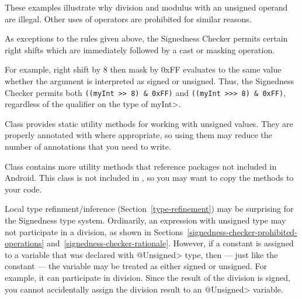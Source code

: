 These examples illustrate why division and modulus with an unsigned operand
are illegal.  Other uses of operators are prohibited for similar reasons.



As exceptions to the rules given above, the Signedness Checker permits
certain right shifts which are immediately followed by a cast or
masking operation.

For example, right shift by 8 then mask by 0xFF evaluates to the same value
whether the argument is interpreted as signed or unsigned.  Thus, the
Signedness Checker permits both \verb|((myInt >> 8) & 0xFF)| and
\verb|((myInt >>> 8) & 0xFF)|, regardless of the qualifier on the type of
\<myInt>.




Class  provides static
utility methods for working with unsigned values.  They are
properly annotated with 
where appropriate, so using them may reduce the number of annotations that
you need to write.

Class  contains more utility
methods that reference packages not included in Android.  This class is not
included in , so you may want to copy the methods to your code.



Local type refinment/inference (Section~\ref{type-refinement}) may be
surprising for the Signedness type system.  Ordinarily, an expression with
unsigned type may not participate in a division, as shown in
Sections~\ref{signedness-checker-prohibited-operations}
and~\ref{signedness-checker-rationale}.  However, if a constant is assigned
to a variable that was declared with \<@Unsigned> type, then --- just like
the constant --- the variable may be treated as either signed or unsigned.
For example, it can participate in division.  Since the result of the
division is signed, you cannot accidentally assign the division result to
an \<@Unsigned> variable.

